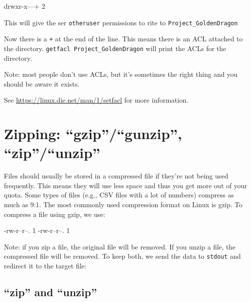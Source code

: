 \begin{prompt}
drwxr-x---+ 2 %
\end{prompt}

This will give the ser \lstinline|otheruser| permissions to rite
to \lstinline|Project_GoldenDragon|

Now there is a \lstinline|+| at the end of the line. This means there is an ACL attached
to the directory. \lstinline|getfacl Project_GoldenDragon| will print the ACLs for the
directory.

Note: most people don't use ACLs, but it's sometimes the right thing and you
should be aware it exists.

See \url{https://linux.die.net/man/1/setfacl} for more information.

\section{Zipping: ``gzip''/``gunzip'', ``zip''/``unzip''}

Files should usually be stored in a compressed file if they're not being used
frequently. This means they will use less space and thus you get more out of
your quota. Some types of files (e.g., CSV files with a lot of numbers) compress
as much as 9:1. The most commonly used compression format on Linux is gzip. To
compress a file using gzip, we use:

\begin{prompt}
    -rw-r--r--. 1 %
    -rw-r--r--. 1 %
\end{prompt}

Note: if you zip a file, the original file will be removed. If you unzip a file,
the compressed file will be removed. To keep both, we send the data to
\lstinline|stdout| and redirect it to the target file:

\begin{prompt}
\end{prompt}

\subsection{``zip'' and ``unzip''}

